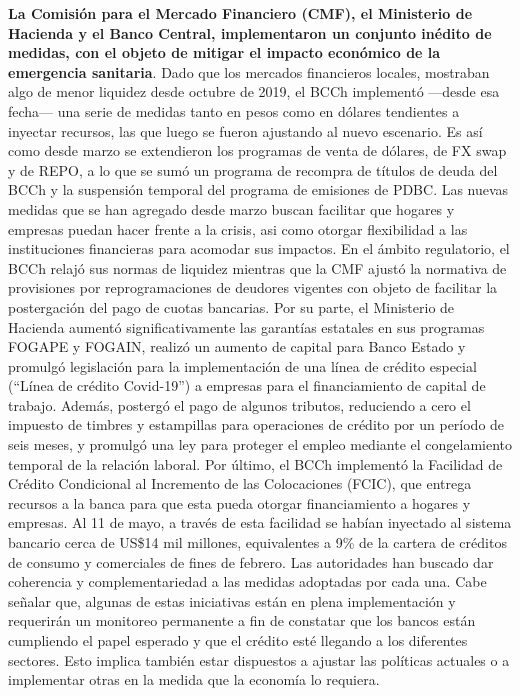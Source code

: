 \documentclass[
]{book}
\begin{document}
\textbf{La Comisión para el Mercado Financiero (CMF), el Ministerio de Hacienda y el Banco Central, implementaron un conjunto inédito de medidas, con el objeto de mitigar el impacto económico de la emergencia sanitaria}. Dado que los mercados financieros locales, mostraban
algo de menor liquidez desde octubre de 2019, el BCCh implementó ---desde
esa fecha--- una serie de medidas tanto en pesos como en dólares tendientes
a inyectar recursos, las que luego se fueron ajustando al nuevo escenario. Es
así como desde marzo se extendieron los programas de venta de dólares, de FX
swap y de REPO, a lo que se sumó un programa de recompra de títulos de deuda
del BCCh y la suspensión temporal del programa de emisiones de PDBC. Las
nuevas medidas que se han agregado desde marzo buscan facilitar que hogares
y empresas puedan hacer frente a la crisis, asi como otorgar flexibilidad a las
instituciones financieras para acomodar sus impactos. En el ámbito regulatorio,
el BCCh relajó sus normas de liquidez mientras que la CMF ajustó la normativa
de provisiones por reprogramaciones de deudores vigentes con objeto de facilitar
la postergación del pago de cuotas bancarias. Por su parte, el Ministerio de
Hacienda aumentó significativamente las garantías estatales en sus programas
FOGAPE y FOGAIN, realizó un aumento de capital para Banco Estado y promulgó
legislación para la implementación de una línea de crédito especial (``Línea de
crédito Covid-19'') a empresas para el financiamiento de capital de trabajo.
Además, postergó el pago de algunos tributos, reduciendo a cero el impuesto de
timbres y estampillas para operaciones de crédito por un período de seis meses, y
promulgó una ley para proteger el empleo mediante el congelamiento temporal
de la relación laboral. Por último, el BCCh implementó la Facilidad de Crédito
Condicional al Incremento de las Colocaciones (FCIC), que entrega recursos a la
banca para que esta pueda otorgar financiamiento a hogares y empresas. Al 11
de mayo, a través de esta facilidad se habían inyectado al sistema bancario cerca
de US\$14 mil millones, equivalentes a 9\% de la cartera de créditos de consumo
y comerciales de fines de febrero. Las autoridades han buscado dar coherencia
y complementariedad a las medidas adoptadas por cada una. Cabe señalar
que, algunas de estas iniciativas están en plena implementación y requerirán
un monitoreo permanente a fin de constatar que los bancos están cumpliendo
el papel esperado y que el crédito esté llegando a los diferentes sectores. Esto
implica también estar dispuestos a ajustar las políticas actuales o a implementar
otras en la medida que la economía lo requiera.
\end{document}
